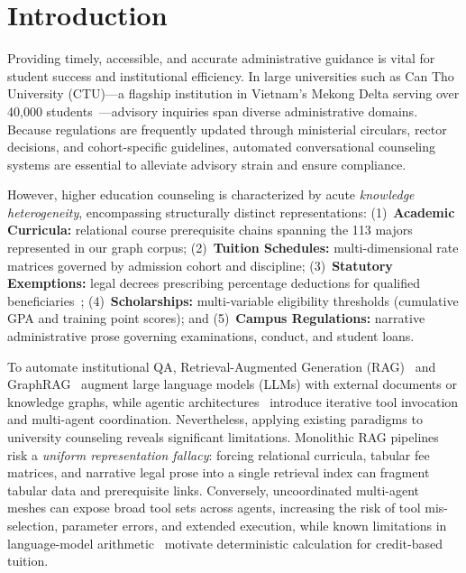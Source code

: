\section{Introduction}
\label{sec:intro}

Providing timely, accessible, and accurate administrative guidance is vital for student success and institutional efficiency. In large universities such as Can Tho University (CTU)---a flagship institution in Vietnam's Mekong Delta serving over 40,000 students~\cite{ctu2022handbook}---advisory inquiries span diverse administrative domains. Because regulations are frequently updated through ministerial circulars, rector decisions, and cohort-specific guidelines, automated conversational counseling systems are essential to alleviate advisory strain and ensure compliance.

However, higher education counseling is characterized by acute \emph{knowledge heterogeneity}, encompassing structurally distinct representations: (1)~\textbf{Academic Curricula:} relational course prerequisite chains spanning the 113 majors represented in our graph corpus; (2)~\textbf{Tuition Schedules:} multi-dimensional rate matrices governed by admission cohort and discipline; (3)~\textbf{Statutory Exemptions:} legal decrees prescribing percentage deductions for qualified beneficiaries~\cite{government2021decree81,government2023decree97}; (4)~\textbf{Scholarships:} multi-variable eligibility thresholds (cumulative GPA and training point scores); and (5)~\textbf{Campus Regulations:} narrative administrative prose governing examinations, conduct, and student loans.

To automate institutional QA, Retrieval-Augmented Generation (RAG)~\cite{lewis2020rag,gao2023rag_survey} and GraphRAG~\cite{edge2024graphrag} augment large language models (LLMs) with external documents or knowledge graphs, while agentic architectures~\cite{yao2023react,wu2023autogen,schick2023toolformer} introduce iterative tool invocation and multi-agent coordination. Nevertheless, applying existing paradigms to university counseling reveals significant limitations. Monolithic RAG pipelines risk a \emph{uniform representation fallacy}: forcing relational curricula, tabular fee matrices, and narrative legal prose into a single retrieval index can fragment tabular data and prerequisite links. Conversely, uncoordinated multi-agent meshes can expose broad tool sets across agents, increasing the risk of tool mis-selection, parameter errors, and extended execution, while known limitations in language-model arithmetic~\cite{qian2023limitations} motivate deterministic calculation for credit-based tuition.

